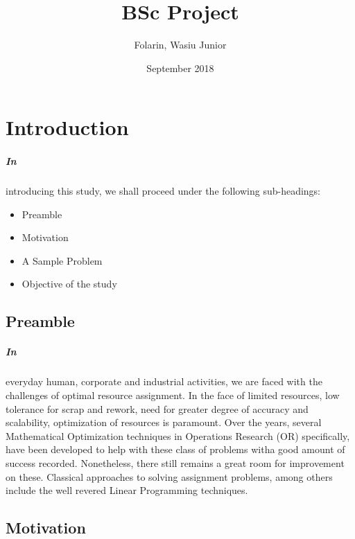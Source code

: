 \documentclass[a4paper]{book}
\title{BSc Project}
\date{September 2018}
\author{Folarin, Wasiu Junior}
\begin{document}
    \normalsize
    \linespread{2.0}
    \chapter{Introduction}
        \paragraph{In}
        introducing this study, we shall proceed under the following sub-headings:
        \begin{itemize}
            \item Preamble
            \item Motivation
            \item A Sample Problem
            \item Objective of the study
        \end{itemize}
        \section{Preamble}
        \paragraph{In}
			everyday human, corporate and industrial activities, we are faced with the challenges of optimal resource assignment. In the face of limited resources, low tolerance for scrap and rework, need for greater degree of accuracy and scalability, optimization of resources is paramount.
            Over the years, several Mathematical Optimization techniques in Operations Research (OR) specifically, have been developed to help with these class of problems witha good amount of success recorded. Nonetheless, there still remains a great room for improvement on these. Classical approaches to solving assignment problems, among others include the well revered Linear Programming techniques.
        \\
		\section{Motivation}
\end{document}
